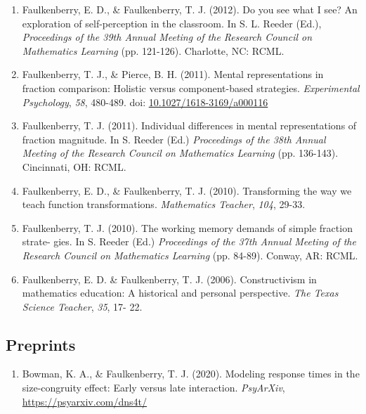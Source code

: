 \documentclass[article,10pt]{article}
\begin{document}
\begin{enumerate}
\item Faulkenberry, E. D., \& Faulkenberry, T. J. (2012). Do you see what I see? An exploration of self-perception in the classroom. In S. L. Reeder (Ed.), \emph{Proceedings of the 39th Annual Meeting of the Research Council on Mathematics Learning} (pp. 121-126). Charlotte, NC: RCML.
\item Faulkenberry, T. J., \& Pierce, B. H. (2011). Mental representations in fraction comparison: Holistic versus component-based strategies. \emph{Experimental Psychology}, \emph{58}, 480-489. doi: \href{http://dx.doi.org/10.1027/1618-3169/a000116}{10.1027/1618-3169/a000116}
\item Faulkenberry, T. J. (2011). Individual differences in mental representations of fraction magnitude. In S. Reeder (Ed.) \emph{Proceedings of the 38th Annual Meeting of the Research Council on Mathematics Learning} (pp. 136-143). Cincinnati, OH: RCML.
\item Faulkenberry, E. D., \& Faulkenberry, T. J. (2010). Transforming the way we teach function transformations. \emph{Mathematics Teacher}, \emph{104}, 29-33.
\item Faulkenberry, T. J. (2010). The working memory demands of simple fraction strate- gies. In S. Reeder (Ed.) \emph{Proceedings of the 37th Annual Meeting of the Research Council on Mathematics Learning} (pp. 84-89). Conway, AR: RCML.
\item Faulkenberry, E. D. \& Faulkenberry, T. J. (2006). Constructivism in mathematics education: A historical and personal perspective. \emph{The Texas Science Teacher}, \emph{35}, 17- 22.
\end{enumerate}

\subsection*{Preprints}
\label{sec:org3a2e973}
\begin{enumerate}
\item Bowman, K. A., \& Faulkenberry, T. J. (2020). Modeling response times in the size-congruity effect: Early versus late interaction. \emph{PsyArXiv}, \url{https://psyarxiv.com/dns4t/}
\end{enumerate}
\end{document}
